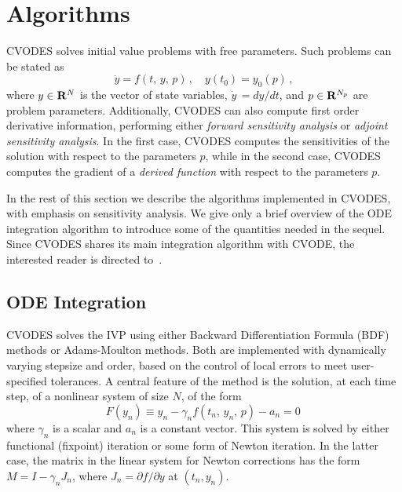 \section{Algorithms}\label{s:algorithms}

CVODES solves initial value problems with free parameters. 
Such problems can be stated as
\begin{equation}\label{e:ivp}
\dot{y}  = f(t,\,y,\,p) \, , \quad y(t_0)  = y_0(p) \, ,
\end{equation}
where $y \in {\bf R}^N$ is  the vector of state variables, 
$\dot{y}\,=dy/dt$, and $p \in {\bf R}^{N_p}$ are problem parameters.
Additionally, CVODES can also compute first order derivative
information, performing either
{\em forward sensitivity analysis} or {\em adjoint sensitivity analysis}.
In the first case, CVODES computes the sensitivities of the solution
with respect to the parameters $p$, while in the second case, CVODES
computes the gradient of a {\em derived function} with respect to the
parameters $p$.

In the rest of this section we describe the algorithms implemented in
CVODES, with emphasis on sensitivity analysis. We give only a brief
overview of the ODE integration algorithm to introduce some of the
quantities needed in the sequel.  Since CVODES shares its main
integration algorithm with CVODE, the interested reader is directed
to~\cite{HBGLSSW:04}.


\subsection{ODE Integration}\label{ss:integration}

CVODES solves the IVP using either Backward Differentiation Formula
(BDF) methods or Adams-Moulton methods.  Both are implemented with
dynamically varying stepsize and order, based on the control of local
errors to meet user-specified tolerances.  A central feature of the
method is the solution, at each time step, of a nonlinear system of
size $N$, of the form
\begin{equation}\label{e:nonlinear}
    F(y_n) \equiv y_n - \gamma_n f(t_n,\,y_n,\,p) - a_n = 0 \,
\end{equation}
where $\gamma_n$ is a scalar and $a_n$ is a constant vector.
This system is solved by either functional (fixpoint) iteration or
some form of Newton iteration.  In the latter case, the matrix in the
linear system for Newton corrections has the form $M = I-\gamma_nJ_n$,
where $J_n = {\partial f}/{\partial y}$ at $(t_n,y_n)$.

